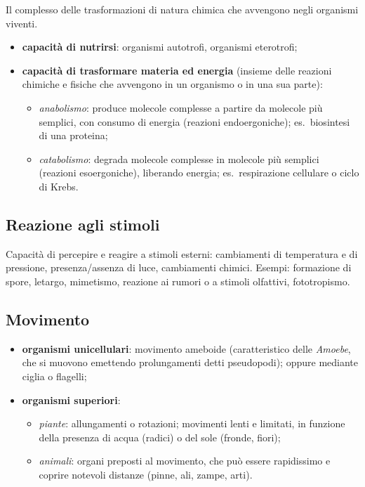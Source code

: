 Il complesso delle trasformazioni di natura chimica che avvengono negli organismi viventi.
\begin{itemize}
  \item \textbf{capacità di nutrirsi}: organismi autotrofi, organismi eterotrofi;
  \item \textbf{capacità di trasformare materia ed energia} (insieme delle reazioni chimiche e fisiche che avvengono in un organismo o in una sua parte):
    \begin{itemize}
      \item \textit{anabolismo}: produce molecole complesse a partire da molecole più semplici, con consumo di energia (reazioni endoergoniche); es.\ biosintesi di una proteina;
      \item \textit{catabolismo}: degrada molecole complesse in molecole più semplici (reazioni esoergoniche), liberando energia; es.\ respirazione cellulare o ciclo di Krebs.
    \end{itemize}
\end{itemize}

\subsection{Reazione agli stimoli}

Capacità di percepire e reagire a stimoli esterni: cambiamenti di temperatura e di pressione, presenza/assenza di luce, cambiamenti chimici. Esempi: formazione di spore, letargo, mimetismo, reazione ai rumori o a stimoli olfattivi, fototropismo.

\subsection{Movimento}

\begin{itemize}
  \item \textbf{organismi unicellulari}: movimento ameboide (caratteristico delle \textit{Amoebe}, che si muovono emettendo prolungamenti detti pseudopodi); oppure mediante ciglia o flagelli;
  \item \textbf{organismi superiori}:
    \begin{itemize}
      \item \textit{piante}: allungamenti o rotazioni; movimenti lenti e limitati, in funzione della presenza di acqua (radici) o del sole (fronde, fiori);
      \item \textit{animali}: organi preposti al movimento, che può essere rapidissimo e coprire notevoli distanze (pinne, ali, zampe, arti).
    \end{itemize}
\end{itemize}


